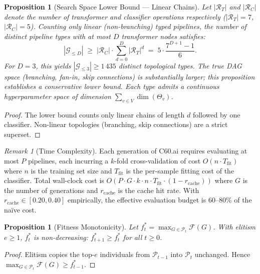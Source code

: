 \documentclass{article}
\theoremstyle{definition}
\theoremstyle{plain}
\newtheorem{proposition}[definition]{Proposition}
\theoremstyle{remark}
\newtheorem{remark}[definition]{Remark}
\begin{document}
\begin{proposition}[Search Space Lower Bound — Linear Chains]
\label{prop:space}
Let $|\mathcal{R}_T|$ and $|\mathcal{R}_C|$ denote the number of transformer
and classifier operations respectively ($|\mathcal{R}_T| = 7$,
$|\mathcal{R}_C| = 5$).
Counting only \emph{linear} (non-branching) typed pipelines,
the number of distinct pipeline types with at most $D$ transformer
nodes satisfies:
\begin{equation}
  |\mathcal{G}_{\leq D}| \;\geq\;
    |\mathcal{R}_C| \cdot \sum_{d=0}^{D} |\mathcal{R}_T|^d
    \;=\; 5 \cdot \frac{7^{D+1} - 1}{6}.
  \label{eq:space}
\end{equation}
For $D = 3$, this yields $|\mathcal{G}_{\leq 3}| \geq 1\,435$
distinct \emph{topological types}.
The true DAG space (branching, fan-in, skip connections) is substantially
larger; this proposition establishes a conservative lower bound.
Each type admits a continuous hyperparameter space of dimension
$\sum_{v \in V} \dim(\Theta_v)$.
\end{proposition}

\begin{proof}
The lower bound counts only linear chains of length $d$ followed by one
classifier.
Non-linear topologies (branching, skip connections) are a strict superset.
\end{proof}

\begin{remark}[Time Complexity]
\label{rem:complexity}
Each generation of C60.ai requires evaluating at most $P$ pipelines,
each incurring a $k$-fold cross-validation of cost $O(n \cdot T_\mathrm{fit})$
where $n$ is the training set size and $T_\mathrm{fit}$ is the per-sample
fitting cost of the classifier.
Total wall-clock cost is $O(P \cdot G \cdot k \cdot n \cdot T_\mathrm{fit}
\cdot (1 - r_\mathrm{cache}))$
where $G$ is the number of generations and $r_\mathrm{cache}$ is the cache
hit rate.
With $r_\mathrm{cache} \in [0.20, 0.40]$ empirically, the effective
evaluation budget is 60--80\% of the na\"ive cost.
\end{remark}

\begin{proposition}[Fitness Monotonicity]
\label{prop:monotone}
Let $f^*_t = \max_{G \in \mathcal{P}_t} \mathcal{F}(G)$.
With elitism $e \geq 1$, $f^*_t$ is non-decreasing: $f^*_{t+1} \geq f^*_t$
for all $t \geq 0$.
\end{proposition}

\begin{proof}
Elitism copies the top-$e$ individuals from $\mathcal{P}_{t-1}$ into
$\mathcal{P}_t$ unchanged.
Hence $\max_{G \in \mathcal{P}_t} \mathcal{F}(G) \geq f^*_{t-1}$.
\end{proof}
\end{document}
